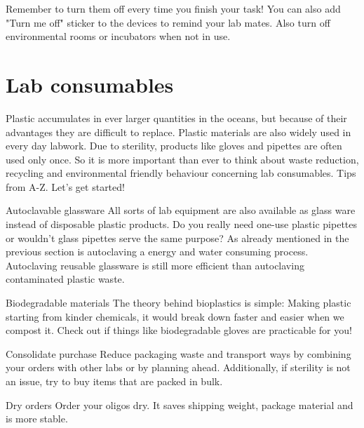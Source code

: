 	
\begin{suggest}{Remember to turn them off every time you finish your task!} 
	You can also add "Turn me off" sticker to the devices to remind your lab mates. 
	Also turn off environmental rooms or incubators when not in use.
\end{suggest}	

	
\section{Lab consumables}
Plastic accumulates in ever larger quantities in the oceans, but because of their advantages they are difficult to replace. 
Plastic materials are also widely used in every day labwork. Due to sterility, products like gloves and pipettes are often used only once. 
So it is more important than ever to think about waste reduction, recycling and environmental friendly behaviour concerning lab consumables.
Tips from A-Z. Let's get started! 

\begin{suggest}{Autoclavable glassware}
	All sorts of lab equipment are also available as glass ware instead of disposable plastic products. Do you really need one-use plastic pipettes or wouldn't glass pipettes serve the same purpose? As already mentioned in the previous section is autoclaving a energy and water consuming process. 
	Autoclaving reusable glassware is still more efficient than autoclaving contaminated plastic waste. 
\end{suggest}

\begin{suggest} {Biodegradable materials}
	The theory behind bioplastics is simple: 
	Making plastic starting from kinder chemicals, it would break down faster and easier when we compost it. 
	Check out if things like biodegradable gloves are practicable for you!
\end{suggest}

\begin{suggest}{Consolidate purchase}
	Reduce packaging waste and transport ways by combining your orders with other labs or by planning ahead. Additionally, if sterility is not an issue, try to buy items that are packed in bulk.
\end{suggest}

\begin{suggest}{Dry orders}
		Order your oligos dry. It saves shipping weight, package material and is more stable. 
\end{suggest}

